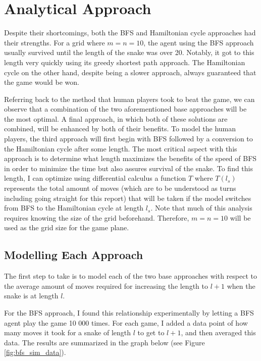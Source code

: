 \documentclass[12pt]{article}
\begin{document}
\section{Analytical Approach}

Despite their shortcomings, both the BFS and Hamiltonian cycle approaches had their strengths. For a grid where $m=n=10$, the agent using the BFS approach usually survived until the length of the snake was over 20. Notably, it got to this length very quickly using its greedy shortest path approach. The Hamiltonian cycle on the other hand, despite being a slower approach, always guaranteed that the game would be won.

Referring back to the method that human players took to beat the game, we can observe that a combination of the two aforementioned base approaches will be the most optimal. A final approach, in which both of these solutions are combined, will be enhanced by both of their benefits. To model the human players, the third approach will first begin with BFS followed by a conversion to the Hamiltonian cycle after some length. The most critical aspect with this approach is to determine what length maximizes the benefits of the speed of BFS in order to minimize the time but also assures survival of the snake. To find this length, I can optimize using differential calculus a function $T$  where $T(l_{s})$ represents the total amount of moves (which are to be understood as turns including going straight for this report) that will be taken if the model switches from BFS to the Hamiltonian cycle at length $l_{s}$. Note that much of this analysis requires knowing the size of the grid beforehand. Therefore, $m=n=10$ will be used as the grid size for the game plane.

\subsection{Modelling Each Approach}

The first step to take is to model each of the two base approaches with respect to the average amount of moves required for increasing the length to $l+1$ when the snake is at length $l$.

For the BFS approach, I found this relationship experimentally by letting a BFS agent play the game 10 000 times. For each game, I added a data point of how many moves it took for a snake of length $l$ to get to $l+1$, and then averaged this data. The results are summarized in the graph below (see Figure \ref{fig:bfs_sim_data}).
\end{document}

